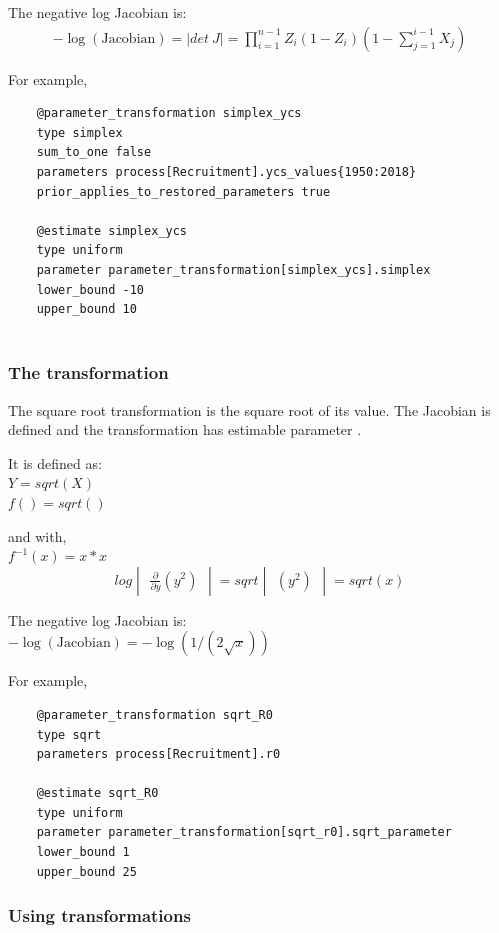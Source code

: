 The negative log Jacobian is: \\
\begin{align*}
-\log(\text{Jacobian}) = |det \ J| = \prod_{i = 1}^{n - 1} Z_i \left(1 - Z_i\right) \left(1 - \sum_{j = 1}^{i - 1}X_j\right)
\end{align*}

For example,
{\small{\begin{verbatim}
	@parameter_transformation simplex_ycs
	type simplex
	sum_to_one false
	parameters process[Recruitment].ycs_values{1950:2018}
	prior_applies_to_restored_parameters true
	
	@estimate simplex_ycs
	type uniform
	parameter parameter_transformation[simplex_ycs].simplex
	lower_bound -10
	upper_bound 10
	
\end{verbatim}}}	

\subsubsection{The  transformation} \label{sec:Transformation-Sqrt}

The square root transformation is the square root of its value. The Jacobian is defined and the transformation has estimable parameter .

It is defined as:\\
$Y = sqrt(X)$\\
$f() = sqrt()$

and with, \\
$f^{-1}(x) = x * x$
\[log \begin{vmatrix} \frac{\partial}{\partial y}  (y^2) \end{vmatrix} = sqrt \begin{vmatrix}  (y^2) \end{vmatrix} = sqrt(x) \]

The negative log Jacobian is: \\
$-\log(\text{Jacobian}) = -\log{(1/(2\sqrt{x}))}$
	
For example,
{\small{\begin{verbatim}
	@parameter_transformation sqrt_R0
	type sqrt
	parameters process[Recruitment].r0
	
	@estimate sqrt_R0
	type uniform
	parameter parameter_transformation[sqrt_r0].sqrt_parameter
	lower_bound 1
	upper_bound 25
\end{verbatim}}}
	
\subsubsection{Using transformations}

